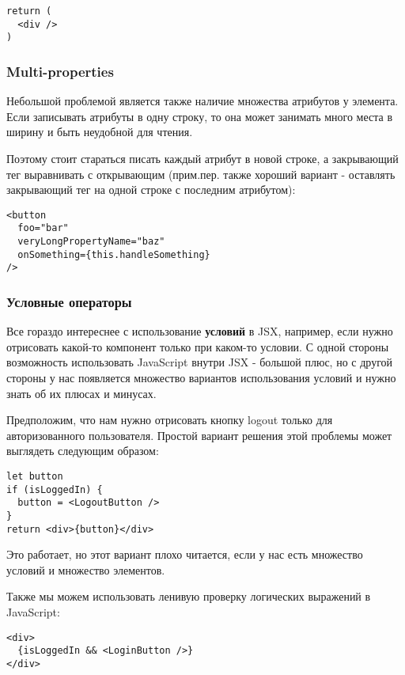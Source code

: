 \begin{lstlisting}
return (
  <div />
)
\end{lstlisting}

\subsubsection{Multi-properties}

Небольшой проблемой является также наличие множества атрибутов у элемента. Если записывать атрибуты в одну строку, то она может занимать много места в ширину и быть неудобной для чтения. 

Поэтому стоит стараться писать каждый атрибут в новой строке, а закрывающий тег выравнивать с открывающим (прим.пер. также хороший вариант - оставлять закрывающий тег на одной строке с последним атрибутом):

\begin{lstlisting}
<button
  foo="bar"
  veryLongPropertyName="baz"
  onSomething={this.handleSomething}
/>
\end{lstlisting}

\subsubsection{Условные операторы}

Все гораздо интереснее с использование \textbf{условий} в JSX, например, если нужно отрисовать какой-то компонент только при каком-то условии. С одной стороны возможность использовать JavaScript внутри JSX - большой плюс, но с другой стороны у нас появляется множество вариантов использования условий и нужно знать об их плюсах и минусах.

Предположим, что нам нужно отрисовать кнопку logout только для авторизованного пользователя. Простой вариант решения этой проблемы может выглядеть следующим образом:

\begin{lstlisting}
let button
if (isLoggedIn) {
  button = <LogoutButton />
}
return <div>{button}</div>
\end{lstlisting}
   
Это работает, но этот вариант плохо читается, если у нас есть множество условий и множество элементов.

Также мы можем использовать ленивую проверку логических выражений в JavaScript:

\begin{lstlisting}
<div>
  {isLoggedIn && <LoginButton />}
</div>
\end{lstlisting}

